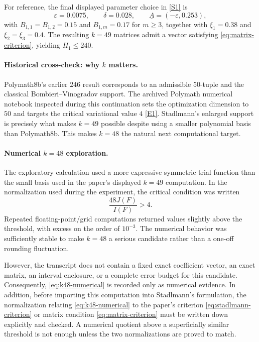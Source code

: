 \documentclass[11pt]{article}
\begin{document}
For reference, the final displayed parameter choice in \href{https://arxiv.org/abs/2608.31126}{[S1]} is
\[
 \varepsilon=0.0075,\qquad \delta=0.028,\qquad
 \underline A=(-\varepsilon,0.253),
\]
with $B_{1,1}=B_{1,2}=0.15$ and $B_{1,m}=0.17$ for $m\ge3$, together with $\xi_1=0.38$ and $\xi_2=\xi_3=0.4$.  The resulting $k=49$ matrices admit a vector satisfying \eqref{eq:matrix-criterion}, yielding $H_1\le240$.

\paragraph{Historical cross-check: why $k$ matters.}
Polymath8b's earlier $246$ result corresponds to an admissible $50$-tuple and the classical Bombieri--Vinogradov support.  The archived Polymath numerical notebook inspected during this continuation sets the optimization dimension to $50$ and targets the critical variational value $4$ \href{https://github.com/teorth/tao-web/tree/master/static/papers/polymath8b}{[E1]}.  Stadlmann's enlarged support is precisely what makes $k=49$ possible despite using a smaller polynomial basis than Polymath8b.  This makes $k=48$ the natural next computational target.

\paragraph{Numerical $k=48$ exploration.}
The exploratory calculation used a more expressive symmetric trial function than the small basis used in the paper's displayed $k=49$ computation.  In the normalization used during the experiment, the critical condition was written
\begin{equation}\label{eq:k48-numerical}
 \frac{48J(F)}{I(F)}>4.
\end{equation}
Repeated floating-point/grid computations returned values slightly above the threshold, with excess on the order of $10^{-3}$.  The numerical behavior was sufficiently stable to make $k=48$ a serious candidate rather than a one-off rounding fluctuation.

However, the transcript does not contain a fixed exact coefficient vector, an exact matrix, an interval enclosure, or a complete error budget for this candidate.  Consequently, \eqref{eq:k48-numerical} is recorded only as numerical evidence.  In addition, before importing this computation into Stadlmann's formulation, the normalization relating \eqref{eq:k48-numerical} to the paper's criterion \eqref{eq:stadlmann-criterion} or matrix condition \eqref{eq:matrix-criterion} must be written down explicitly and checked.  A numerical quotient above a superficially similar threshold is not enough unless the two normalizations are proved to match.
\end{document}
